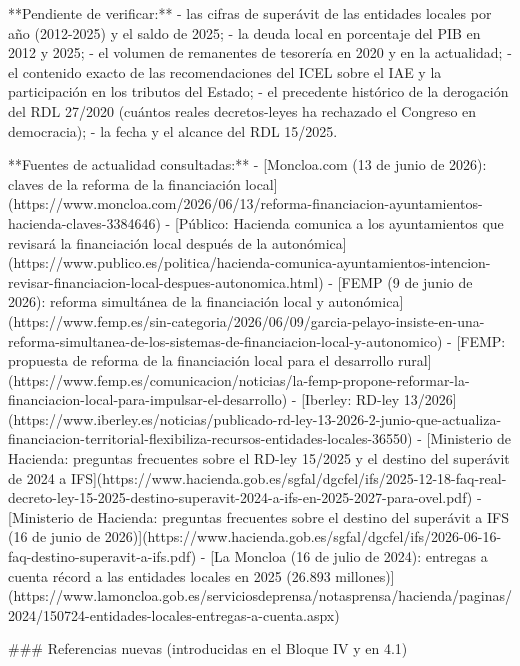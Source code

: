 \documentclass[10pt,a4paper]{article}
\begin{document}
{**Pendiente de verificar:**
- las cifras de superávit de las entidades locales por año (2012-2025) y el saldo de 2025;
- la deuda local en porcentaje del PIB en 2012 y 2025;
- el volumen de remanentes de tesorería en 2020 y en la actualidad;
- el contenido exacto de las recomendaciones del ICEL sobre el IAE y la participación en los tributos del Estado;
- el precedente histórico de la derogación del RDL 27/2020 (cuántos reales decretos-leyes ha rechazado el Congreso en democracia);
- la fecha y el alcance del RDL 15/2025.

**Fuentes de actualidad consultadas:**
- [Moncloa.com (13 de junio de 2026): claves de la reforma de la financiación local](https://www.moncloa.com/2026/06/13/reforma-financiacion-ayuntamientos-hacienda-claves-3384646)
- [Público: Hacienda comunica a los ayuntamientos que revisará la financiación local después de la autonómica](https://www.publico.es/politica/hacienda-comunica-ayuntamientos-intencion-revisar-financiacion-local-despues-autonomica.html)
- [FEMP (9 de junio de 2026): reforma simultánea de la financiación local y autonómica](https://www.femp.es/sin-categoria/2026/06/09/garcia-pelayo-insiste-en-una-reforma-simultanea-de-los-sistemas-de-financiacion-local-y-autonomico)
- [FEMP: propuesta de reforma de la financiación local para el desarrollo rural](https://www.femp.es/comunicacion/noticias/la-femp-propone-reformar-la-financiacion-local-para-impulsar-el-desarrollo)
- [Iberley: RD-ley 13/2026](https://www.iberley.es/noticias/publicado-rd-ley-13-2026-2-junio-que-actualiza-financiacion-territorial-flexibiliza-recursos-entidades-locales-36550)
- [Ministerio de Hacienda: preguntas frecuentes sobre el RD-ley 15/2025 y el destino del superávit de 2024 a IFS](https://www.hacienda.gob.es/sgfal/dgcfel/ifs/2025-12-18-faq-real-decreto-ley-15-2025-destino-superavit-2024-a-ifs-en-2025-2027-para-ovel.pdf)
- [Ministerio de Hacienda: preguntas frecuentes sobre el destino del superávit a IFS (16 de junio de 2026)](https://www.hacienda.gob.es/sgfal/dgcfel/ifs/2026-06-16-faq-destino-superavit-a-ifs.pdf)
- [La Moncloa (16 de julio de 2024): entregas a cuenta récord a las entidades locales en 2025 (26.893 millones)](https://www.lamoncloa.gob.es/serviciosdeprensa/notasprensa/hacienda/paginas/2024/150724-entidades-locales-entregas-a-cuenta.aspx)

### Referencias nuevas (introducidas en el Bloque IV y en 4.1)

}
\end{document}
